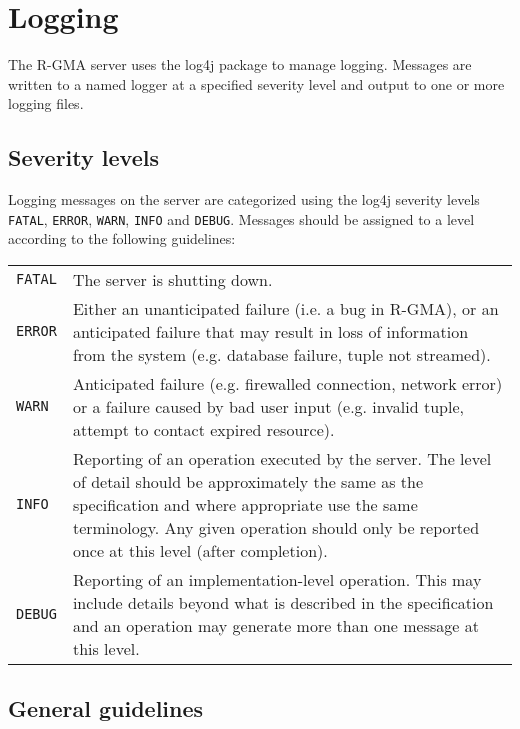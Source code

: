 \section{Logging}
\label{sec:logging}

\begin{sloppypar}
The R-GMA server uses the log4j package to manage logging. Messages
are written to a named logger at a specified severity level and output
to one or more logging files.
\end{sloppypar}

\subsection{Severity levels}

Logging messages on the server are categorized using the log4j
severity levels \texttt{FATAL}, \texttt{ERROR}, \texttt{WARN},
\texttt{INFO} and \texttt{DEBUG}.  Messages should be assigned to a
level according to the following guidelines:

\begin{tabular*}{18cm}{lp{13cm}}
\\
  \texttt{FATAL} & The server is shutting down.\\ 
  \texttt{ERROR} & Either an unanticipated failure (i.e. a bug 
                in R-GMA), or an anticipated failure that may result in loss of
                information from the system (e.g. database failure, tuple 
                not streamed).\\ 
  \texttt{WARN} & Anticipated failure (e.g. firewalled connection, network error)
               or a failure caused by bad user input (e.g. invalid tuple, 
               attempt to contact expired resource).\\ 
  \texttt{INFO} & Reporting of an operation executed by the server. The level
               of detail should be approximately the same as the specification
               and where appropriate use the same terminology. Any given 
               operation should only be reported once at this level (after completion).\\ 
  \texttt{DEBUG} & Reporting of an implementation-level operation. This may include
                details beyond what is described in the specification and an
                operation may generate more than one message at this level.\\ 
\end{tabular*}

\subsection{General guidelines}

